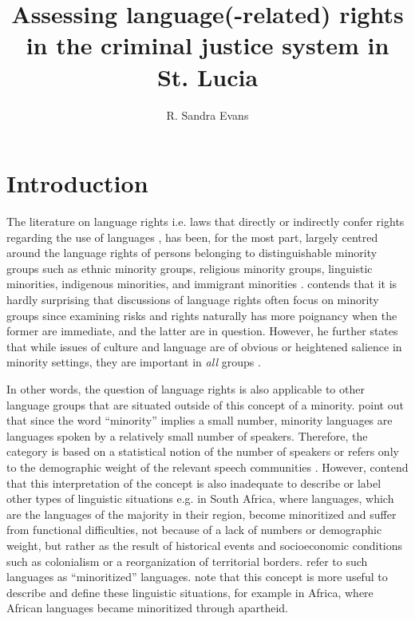 \documentclass[output=paper,colorlinks,citecolor=brown]{langscibook}
\author{R. Sandra Evans \affiliation{The University of the West Indies, St. Augustine}}
\title[Language(-related) rights in the criminal justice system in St. Lucia]{Assessing language(-related) rights in the criminal justice system in St. Lucia}
\begin{document}
\maketitle

\section{Introduction}

The literature on language rights i.e. laws that directly or indirectly confer rights regarding the use of languages \citep[52]{BrownBlake2014}, has been, for the most part, largely centred around the language rights of persons belonging to distinguishable minority groups such as ethnic minority groups, religious minority groups, linguistic minorities, indigenous minorities, and immigrant minorities \citep{Capotorti1991,Thornberry1991,TovePhillipson1995,Edwards2003,Arzoz2007,May2014,May2012,May2011}. \citet[552]{Edwards2003} contends that it is hardly surprising that discussions of language rights often focus on minority groups since examining risks and rights naturally has more poignancy when the former are immediate, and the latter are in question. However, he further states that while issues of culture and language are of obvious or heightened salience in minority settings, they are important in \emph{all} groups \citep[552]{Edwards2003}. 

In other words, the question of language rights is also applicable to other language groups that are situated outside of this concept of a minority. \citet{Aguilar-Amat_Santamaria2000} point out that since the word “minority” implies a small number, minority languages are languages spoken by a relatively small number of speakers. Therefore, the category is based on a statistical notion of the number of speakers \citep{Aguilar-Amat_Santamaria2000} or refers only to the demographic weight of the relevant speech communities \citep{MoeketsiWallmach2005}. However, \citet{MoeketsiWallmach2005} contend that this interpretation of the concept is also inadequate to describe or label other types of linguistic situations e.g. in South Africa, where languages, which are the languages of the majority in their region, become minoritized and suffer from functional difficulties, not because of a lack of numbers or demographic weight, but rather as the result of historical events and socioeconomic conditions such as colonialism or a reorganization of territorial borders. \citet{Aguilar-Amat_Santamaria2000} refer to such languages as “minoritized” languages. \citet[78]{MoeketsiWallmach2005} note that this concept is more useful to describe and define these linguistic situations, for example in Africa, where African languages became minoritized through apartheid.
\end{document}
